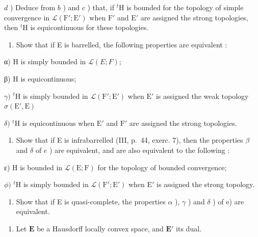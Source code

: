\(d\) ) Deduce from \(b\) ) and \(c\) ) that, if \({}^t\mathrm{H}\) is bounded for the topology of simple convergence in \(\mathcal{L}(\mathrm{F}';\mathrm{E}')\) when \(\mathrm{F}'\) and \(\mathrm{E}'\) are assigned the strong topologies, then \({}^t\mathrm{H}\) is equicontinuous for these topologies.

\begin{enumerate}
\def\labelenumi{\alph{enumi})}
\setcounter{enumi}{4}
\tightlist
\item
  Show that if E is barrelled, the following properties are equivalent :
\end{enumerate}

α) H is simply bounded in \(\mathcal{L}(E; F)\);

β) H is equicontinuous;

\(\gamma)\) \({}^{t}\mathrm{H}\) is simply bounded in \(\mathcal{L}(\mathrm{F}';\mathrm{E}')\) when \(\mathrm{E}'\) is assigned the weak topology \(\sigma (\mathrm{E}',\mathrm{E})\)

\(\delta)\) \({}^{t}\mathrm{H}\) is equicontinuous when \(\mathrm{E}'\) and \(\mathrm{F}'\) are assigned the strong topologies.

\begin{enumerate}
\def\labelenumi{\alph{enumi})}
\setcounter{enumi}{5}
\tightlist
\item
  Show that if E is infrabarrelled (III, p.~44, exerc. 7), then the properties \(\beta\) and \(\delta\) of \(e\) ) are equivalent, and are also equivalent to the following :
\end{enumerate}

ε) H is bounded in \(\mathcal{L}(\mathrm{E};\mathrm{F})\) for the topology of bounded convergence;

\(\phi)\) \({}^{t}\mathrm{H}\) is simply bounded in \(\mathcal{L}(\mathrm{F}';\mathrm{E}')\) when \(\mathrm{E}'\) is assigned the strong topology.

\begin{enumerate}
\def\labelenumi{\alph{enumi})}
\setcounter{enumi}{6}
\tightlist
\item
  Show that if E is quasi-complete, the properties \(\alpha\) ), \(\gamma\) ) and \(\delta\) ) of e) are equivalent.
\end{enumerate}

\begin{enumerate}
\def\labelenumi{\arabic{enumi})}
\setcounter{enumi}{19}
\tightlist
\item
  Let \(\mathbf{E}\) be a Hausdorff locally convex space, and \(\mathbf{E}'\) its dual.
\end{enumerate}

